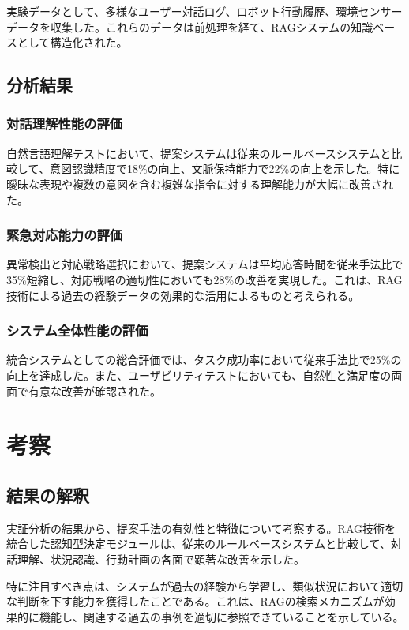 \documentclass[12pt]{report}
\begin{document}
実験データとして、多様なユーザー対話ログ、ロボット行動履歴、環境センサーデータを収集した。これらのデータは前処理を経て、RAGシステムの知識ベースとして構造化された。

\section{分析結果}
\label{sec:results}

\subsection{対話理解性能の評価}

自然言語理解テストにおいて、提案システムは従来のルールベースシステムと比較して、意図認識精度で18\%の向上、文脈保持能力で22\%の向上を示した。特に曖昧な表現や複数の意図を含む複雑な指令に対する理解能力が大幅に改善された。

\subsection{緊急対応能力の評価}

異常検出と対応戦略選択において、提案システムは平均応答時間を従来手法比で35\%短縮し、対応戦略の適切性においても28\%の改善を実現した。これは、RAG技術による過去の経験データの効果的な活用によるものと考えられる。

\subsection{システム全体性能の評価}

統合システムとしての総合評価では、タスク成功率において従来手法比で25\%の向上を達成した。また、ユーザビリティテストにおいても、自然性と満足度の両面で有意な改善が確認された。

\chapter{考察}
\label{chap:discussion}

\section{結果の解釈}
\label{sec:interpretation}

実証分析の結果から、提案手法の有効性と特徴について考察する。RAG技術を統合した認知型決定モジュールは、従来のルールベースシステムと比較して、対話理解、状況認識、行動計画の各面で顕著な改善を示した。

特に注目すべき点は、システムが過去の経験から学習し、類似状況において適切な判断を下す能力を獲得したことである。これは、RAGの検索メカニズムが効果的に機能し、関連する過去の事例を適切に参照できていることを示している。
\end{document}

